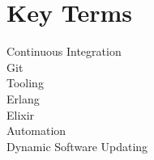 \documentclass[12pt,a4paper,oneside]{article}
\begin{document}
\pagestyle{empty}


\newpage
\pagestyle{fancy}


\renewcommand{\glsnamefont}[1]{\textbf{#1}}
\doublespacing
\printglossary[title=List of Abbreviations,nonumberlist,type=\acronymtype]
\singlespacing

\cleardoublepage

\section*{Key Terms}
Continuous Integration\\
Git \\
Tooling \\
Erlang \\
Elixir \\
Automation \\
Dynamic Software Updating \\

\cleardoublepage

\tableofcontents{}

\cleardoublepage











\end{document}
